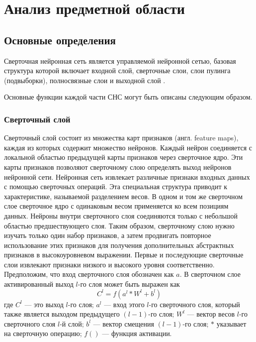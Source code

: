 \chapter{Анализ предметной области}

\section{Основные определения}
 Сверточная нейронная сеть является управляемой нейронной сетью, базовая структура которой включает входной слой, сверточные слои, слои пулинга (подвыборки), полносвязные слои и выходной слой \cite{recursive}.
 
 
Основные функции каждой части СНС могут быть описаны следующим образом.
\subsection{Сверточный слой}
	Сверточный слой состоит из множества карт признаков (англ. feature maps), каждая из которых содержит множество нейронов. Каждый нейрон соединяется с локальной областью предыдущей карты признаков через сверточное ядро. Эти карты признаков позволяют сверточному слою определять выход нейронов нейронной сети. Нейронная сеть извлекает различные признаки входных данных с помощью сверточных операций. Эта специальная структура приводит к характеристике, называемой разделением весов. В одном и том же сверточном слое сверточное ядро с одинаковым весом применяется ко всем позициям данных. Нейроны внутри сверточного слоя соединяются только с небольшой областью предшествующего слоя. Таким образом, сверточному слою нужно изучать только один набор признаков, а затем продвигать повторное использование этих признаков для получения дополнительных абстрактных признаков в высокоуровневом выражении.
	Первые и последующие сверточные слои извлекают признаки низкого и высокого уровня соответственно. Предположим, что вход сверточного слоя обозначен как \( a \). В сверточном слое активированный выход \( l \)-го слоя может быть выражен как
	\begin{equation}
		C^{l} = f(a^{l} \ast W^{l} + b^{l})
	\end{equation}
	где \( C^{l} \) --- это выход \( l \)-го слоя; \( a^{l} \) --- вход этого \( l \)-го сверточного слоя, который также является выходом предыдущего \( (l - 1) \)-го слоя; \( W^{l} \) --- вектор весов \( l \)-го сверточного слоя \( l \)-й слой; \( b^{l} \) --- вектор смещения \( (l - 1) \)-го слоя; \(\ast\) указывает на сверточную операцию; \( f() \) --- функция активации.
